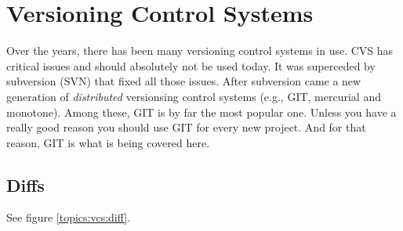 \section{Versioning Control Systems}


Over the years, there has been many versioning control systems in use. CVS has critical issues and should absolutely not be used today. It was superceded by subversion (SVN) that fixed all those issues. After subversion came a new generation of \textsl{distributed} versionsing control systems (e.g., GIT, mercurial and monotone). Among these, GIT is by far the most popular one. Unless you have a really good reason you should use GIT for every new project. And for that reason, GIT is what is being covered here.

\subsection{Diffs}

See figure \ref{topics:vcs:diff}.

